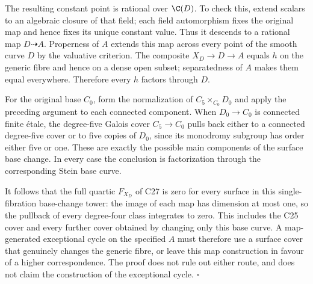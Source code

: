 The resulting constant point is rational over
$\C(D)$.  To check this, extend scalars to an algebraic
closure of that field; each field automorphism fixes
the original map and hence fixes its unique constant
value.  Thus it descends to a rational map $D\dashrightarrow A$.
Properness of $A$ extends this map across every point
of the smooth curve $D$ by the valuative criterion.
The composite $X_D\to D\to A$ equals $h$ on the
generic fibre and hence on a dense open subset;
separatedness of $A$ makes them equal everywhere.
Therefore every $h$ factors through $D$.

For the original base $C_0$, form the normalization
of $C_5\times_{C_0}D_0$ and apply the preceding
argument to each connected component.  When
$D_0\to C_0$ is connected finite \'etale, the
degree-five Galois cover $C_5\to C_0$ pulls back
either to a connected degree-five cover or to five
copies of $D_0$, since its monodromy subgroup has
order either five or one.  These are exactly the
possible main components of the surface base change.
In every case the conclusion is factorization through
the corresponding Stein base curve.

It follows that the full quartic $F_{X_D}$ of C27
is zero for every surface in this single-fibration
base-change tower: the image of each map has dimension
at most one, so the pullback of every degree-four
class integrates to zero.  This includes the C25
cover and every further cover obtained by changing
only this base curve.  A map-generated exceptional
cycle on the specified $A$ must therefore use a
surface cover that genuinely changes the generic
fibre, or leave this map construction in favour of
a higher correspondence.  The proof does not rule
out either route, and does not claim the construction
of the exceptional cycle. \hfill$\square$
